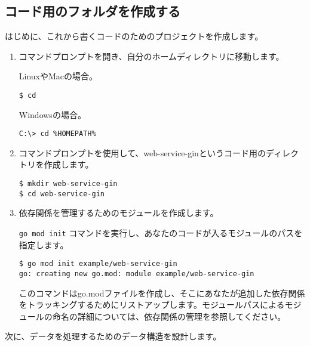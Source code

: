 \subsection{コード用のフォルダを作成する}

はじめに、これから書くコードのためのプロジェクトを作成します。

\begin{enumerate}
\item
  コマンドプロンプトを開き、自分のホームディレクトリに移動します。

  LinuxやMacの場合。



\begin{lstlisting}[numbers=none]
$ cd
\end{lstlisting}

  Windowsの場合。


\begin{lstlisting}[numbers=none]
C:\> cd %HOMEPATH%
\end{lstlisting}

\item
  コマンドプロンプトを使用して、web-service-ginというコード用のディレクトリを作成します。

\begin{lstlisting}[numbers=none]
$ mkdir web-service-gin
$ cd web-service-gin
\end{lstlisting}
\item
  依存関係を管理するためのモジュールを作成します。

  \texttt{go\ mod\ init}
  コマンドを実行し、あなたのコードが入るモジュールのパスを指定します。

\begin{lstlisting}[numbers=none]
$ go mod init example/web-service-gin
go: creating new go.mod: module example/web-service-gin
\end{lstlisting}

  このコマンドはgo.modファイルを作成し、そこにあなたが追加した依存関係をトラッキングするためにリストアップします。モジュールパスによるモジュールの命名の詳細については、依存関係の管理を参照してください。
\end{enumerate}

次に、データを処理するためのデータ構造を設計します。

